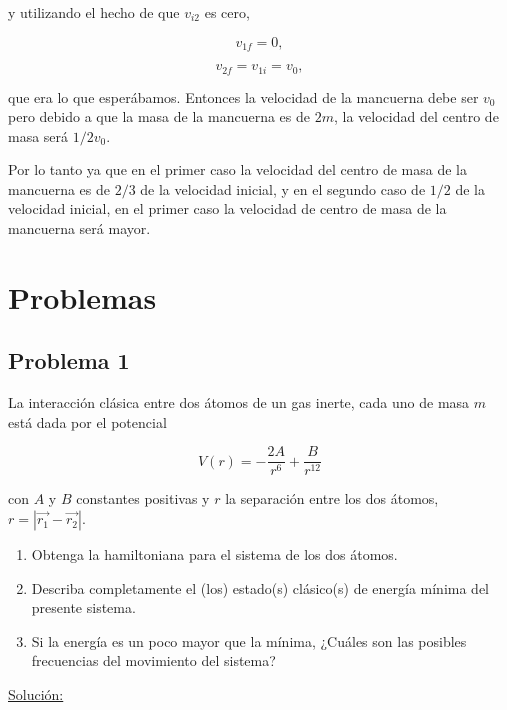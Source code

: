 \documentclass[a4paper,10pt]{article}
\numberwithin{equation}{section}
\begin{document}
y utilizando el hecho de que $v_{i2}$ es cero, 

\begin{equation}
 v_{1f} = 0,
\end{equation}

\begin{equation}
 v_{2f} = v_{1i} = v_0,
\end{equation}

que era lo que esperábamos. Entonces la velocidad de la mancuerna debe ser $v_0$ pero 
debido a que la masa de la mancuerna es de $2m$, la velocidad del centro de masa 
será $1/2v_0$.

\vspace{.3cm}

Por lo tanto ya que en el primer caso la velocidad del centro de masa de la mancuerna 
es de $2/3$ de la velocidad inicial, y en el segundo caso de $1/2$ de la velocidad 
inicial, en el primer caso la velocidad de centro de masa de la mancuerna será 
mayor.

\section{Problemas}

\subsection{Problema 1}

La interacción clásica entre dos átomos de un gas inerte, cada uno de masa $m$ está dada por el
potencial 

$$
V(r) = - \frac{2A}{r^6} + \frac{B}{r^{12}}
$$

con $A$ y $B$ constantes positivas y $r$ la separación entre los dos átomos, $r = |\overrightarrow{r_1} 
- \overrightarrow{r_2}|$.

\begin{enumerate}[label=\alph*)]
 \item Obtenga la hamiltoniana para el sistema de los dos átomos.
 \item Describa completamente el (los) estado(s) clásico(s) de energía mínima del presente 
 sistema.
 \item Si la energía es un poco mayor que la mínima, ¿Cuáles son las posibles frecuencias 
 del movimiento del sistema?
\end{enumerate}

\vspace{.3cm}

\underline{Solución:} \vspace{.3cm}
\end{document}
